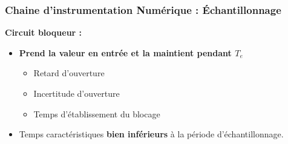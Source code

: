\documentclass{beamer}
\begin{document}
\begin{frame}
\frametitle{Chaine d'instrumentation Numérique : \'Echantillonnage}
\begin{center}
\end{center}
\vspace{0.1cm}
\textbf{\textbf{Circuit bloqueur} :}\\
\vspace{0.2cm}
\begin{itemize}
\item \textbf{Prend la valeur en  entrée et la maintient pendant $T_e$ }
\vspace{0.2cm}
\begin{itemize}
\item Retard d'ouverture 
\vspace{0.2cm}
\item Incertitude d'ouverture 
\vspace{0.2cm}
\item Temps d'établissement du blocage
\end{itemize}
\vspace{0.2cm}
\item Temps caractéristiques \textbf{bien inférieurs} à la période d'échantillonnage.
\end{itemize}
\end{frame}
\end{document}
